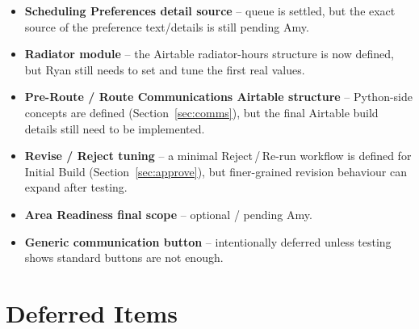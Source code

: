 \documentclass[12pt]{article}
\begin{document}
\begin{itemize}
    \item \textbf{Scheduling Preferences detail source} -- queue is settled, but the exact source of the preference text/details is still pending Amy.
    \item \textbf{Radiator module} -- the Airtable radiator-hours structure is now defined, but Ryan still needs to set and tune the first real values.
    \item \textbf{Pre-Route / Route Communications Airtable structure} -- Python-side concepts are defined (Section~\ref{sec:comms}), but the final Airtable build details still need to be implemented.
    \item \textbf{Revise / Reject tuning} -- a minimal Reject\,/\,Re-run workflow is defined for Initial Build (Section~\ref{sec:approve}), but finer-grained revision behaviour can expand after testing.
    \item \textbf{Area Readiness final scope} -- optional / pending Amy.
    \item \textbf{Generic communication button} -- intentionally deferred unless testing shows standard buttons are not enough.
\end{itemize}

\section*{Deferred Items}
\end{document}
